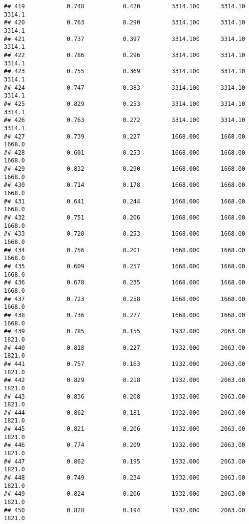 \documentclass[
]{article}
\begin{document}
\begin{verbatim}
## 419            0.748           0.420         3314.100      3314.10       3314.1
## 420            0.763           0.290         3314.100      3314.10       3314.1
## 421            0.737           0.397         3314.100      3314.10       3314.1
## 422            0.786           0.296         3314.100      3314.10       3314.1
## 423            0.755           0.369         3314.100      3314.10       3314.1
## 424            0.747           0.383         3314.100      3314.10       3314.1
## 425            0.829           0.253         3314.100      3314.10       3314.1
## 426            0.763           0.272         3314.100      3314.10       3314.1
## 427            0.739           0.227         1668.000      1668.00       1668.0
## 428            0.601           0.253         1668.000      1668.00       1668.0
## 429            0.832           0.290         1668.000      1668.00       1668.0
## 430            0.714           0.178         1668.000      1668.00       1668.0
## 431            0.641           0.244         1668.000      1668.00       1668.0
## 432            0.751           0.206         1668.000      1668.00       1668.0
## 433            0.720           0.253         1668.000      1668.00       1668.0
## 434            0.756           0.201         1668.000      1668.00       1668.0
## 435            0.609           0.257         1668.000      1668.00       1668.0
## 436            0.678           0.235         1668.000      1668.00       1668.0
## 437            0.723           0.258         1668.000      1668.00       1668.0
## 438            0.736           0.277         1668.000      1668.00       1668.0
## 439            0.785           0.155         1932.000      2063.00       1821.0
## 440            0.818           0.227         1932.000      2063.00       1821.0
## 441            0.757           0.163         1932.000      2063.00       1821.0
## 442            0.829           0.218         1932.000      2063.00       1821.0
## 443            0.836           0.208         1932.000      2063.00       1821.0
## 444            0.862           0.181         1932.000      2063.00       1821.0
## 445            0.821           0.206         1932.000      2063.00       1821.0
## 446            0.774           0.209         1932.000      2063.00       1821.0
## 447            0.862           0.195         1932.000      2063.00       1821.0
## 448            0.749           0.234         1932.000      2063.00       1821.0
## 449            0.824           0.206         1932.000      2063.00       1821.0
## 450            0.828           0.194         1932.000      2063.00       1821.0

\end{verbatim}
\end{document}
